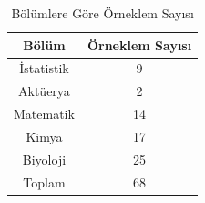 \documentclass{article}
\begin{document}
\begin{table}[h]
    \centering
    \caption{Bölümlere Göre Örneklem Sayısı}
    \label{tab:ağırlıklandırılmış örneklem}
    \begin{tabular}{|c|c|}
         \hline
         Bölüm & Örneklem Sayısı \\
         \hline
         İstatistik & 9 \\
         Aktüerya & 2 \\
         Matematik & 14 \\
         Kimya & 17 \\
         Biyoloji & 25 \\
         \hline
         Toplam & 68 \\
         \hline
    \end{tabular}
\end{table}

\clearpage
\end{document}
